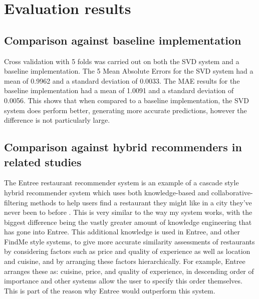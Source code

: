 \documentclass[conference]{IEEEtran}
\begin{document}
\section{Evaluation results}

\subsection{Comparison against baseline implementation}
Cross validation with 5 folds was carried out on both the SVD system and a baseline implementation. 
The 5 Mean Absolute Errors for the SVD system had a mean of 0.9962 and a standard deviation of 0.0033. 
The MAE results for the baseline implementation had a mean of 1.0091 and a standard deviation of 0.0056. 
This shows that when compared to a baseline implementation, the SVD system does perform better, generating more 
accurate predictions, however the difference is not particularly large. 

\subsection{Comparison against hybrid recommenders in related studies}
The Entree restaurant recommender system is an example of a cascade style hybrid recommender system which 
uses both knowledge-based and collaborative-filtering methods to help users find a restaurant they might like in 
a city they've never been to before \cite{burke1999integrating,burke2000knowledge,burke2002hybrid,burke2007hybrid}. 
This is very similar to the way my system works, with the biggest difference being the vastly greater amount of 
knowledge engineering that has gone into Entree. 
This additional knowledge is used in Entree, and other FindMe style systems, to give more accurate similarity assessments 
of restaurants by considering factors such as price and quality of experience as well as location and cuisine, 
and by arranging these factors hierarchically. 
For example, Entree arranges these as: cuisine, price, and quality of experience, in descending order of importance 
and other systems allow the user to specify this order themselves. 
This is part of the reason why Entree would outperform this system. 
\end{document}
